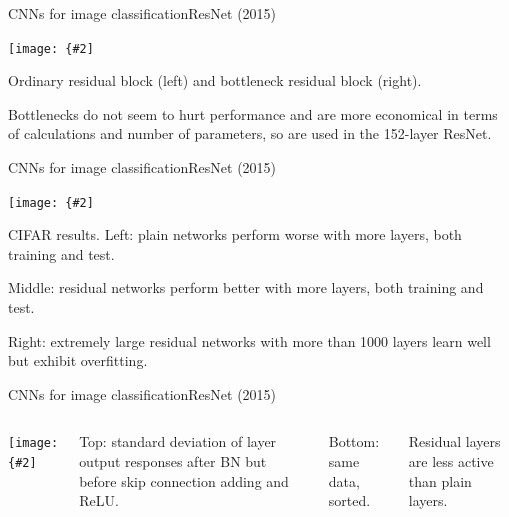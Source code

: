 \documentclass{beamer}
\newcommand{\myfig}[3]{\centerline{\texttt{[image: \{\#2]}}}
\begin{document}
\begin{frame}{CNNs for image classification}{ResNet (2015)}

  \myfig{4in}{he-fig5}{He et al.\ (2016), Fig.\ 5}

  \medskip

  Ordinary residual block (left) and bottleneck residual block (right).

  \medskip

  Bottlenecks do not seem to hurt performance and are more economical
  in terms of calculations and number of parameters, so are used in
  the 152-layer ResNet.

\end{frame}


\begin{frame}{CNNs for image classification}{ResNet (2015)}

  \myfig{4.2in}{he-fig6}{He et al.\ (2016), Fig.\ 6}

  \medskip

  CIFAR results.
  Left: plain networks perform worse with more layers, both training
  and test.

  \medskip

  Middle: residual networks perform better with more layers, both
  training and test.

  \medskip

  Right: extremely large residual networks with more than 1000 layers
  learn well but exhibit overfitting.
  
\end{frame}


\begin{frame}{CNNs for image classification}{ResNet (2015)}

  \begin{columns}

    \column{2.5in}
    
    \myfig{2.4in}{he-fig7}{He et al.\ (2016), Fig.\ 7}

    \column{2in}

    Top: standard deviation of layer output responses after BN but
    before skip connection adding and ReLU.

    \medskip

    Bottom: same data, sorted.

    \medskip

    Residual layers are less active than plain layers.

  \end{columns}
  
\end{frame}
\end{document}
